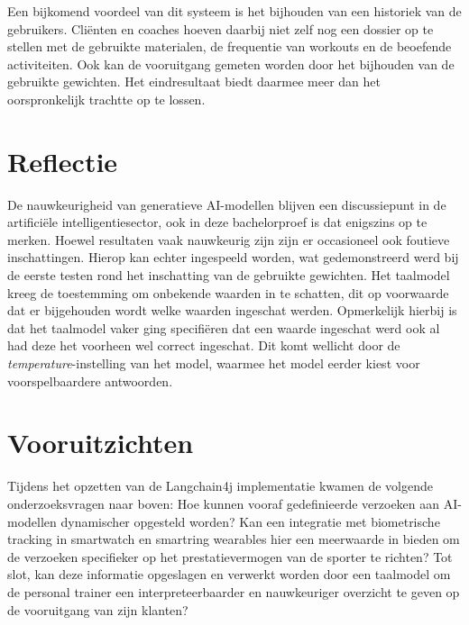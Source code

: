 Een bijkomend voordeel van dit systeem is het bijhouden van een historiek van de gebruikers.
Cliënten en coaches hoeven daarbij niet zelf nog een dossier op te stellen met de gebruikte materialen, de frequentie van workouts en de beoefende activiteiten.
Ook kan de vooruitgang gemeten worden door het bijhouden van de gebruikte gewichten.
Het eindresultaat biedt daarmee meer dan het oorspronkelijk trachtte op te lossen.

\section{Reflectie}
\label{sec:reflectie}
De nauwkeurigheid van generatieve AI-modellen blijven een discussiepunt in de artificiële intelligentiesector, ook in deze bachelorproef is dat enigszins op te merken.
Hoewel resultaten vaak nauwkeurig zijn zijn er occasioneel ook foutieve inschattingen.
Hierop kan echter ingespeeld worden, wat gedemonstreerd werd bij de eerste testen rond het inschatting van de gebruikte gewichten.
Het taalmodel kreeg de toestemming om onbekende waarden in te schatten, dit op voorwaarde dat er bijgehouden wordt welke waarden ingeschat werden.
Opmerkelijk hierbij is dat het taalmodel vaker ging specifiëren dat een waarde ingeschat werd ook al had deze het voorheen wel correct ingeschat.
Dit komt wellicht door de \textit{temperature}-instelling van het model, waarmee het model eerder kiest voor voorspelbaardere antwoorden.

\section{Vooruitzichten}
\label{sec:vooruitzichten}
Tijdens het opzetten van de Langchain4j implementatie kwamen de volgende onderzoeksvragen naar boven:
Hoe kunnen vooraf gedefinieerde verzoeken aan AI-modellen dynamischer opgesteld worden?
Kan een integratie met biometrische tracking in smartwatch en smartring wearables hier een meerwaarde in bieden om de verzoeken specifieker op het prestatievermogen van de sporter te richten?
Tot slot, kan deze informatie opgeslagen en verwerkt worden door een taalmodel om de personal trainer een interpreteerbaarder en nauwkeuriger overzicht te geven op de vooruitgang van zijn klanten?